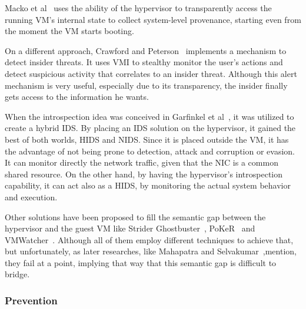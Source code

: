\par Macko et al~\cite{macko2011collecting} uses the ability of the hypervisor to transparently access the running \ac{VM}’s internal state to collect system-level provenance, starting even from the moment the \ac{VM} starts booting. 

\par On a different approach, Crawford and Peterson~\cite{crawford2013insider} implements a mechanism to detect insider threats. It uses \ac{VMI} to stealthy monitor the user’s actions and detect suspicious activity that correlates to an insider threat. Although this alert mechanism is very useful, especially due to its transparency, the insider finally gets access to the information he wants.

\par When the introspection idea was conceived in Garfinkel et al~\cite{garfinkel2003virtual}, it was utilized to create a hybrid \ac{IDS}. By placing an \ac{IDS} solution on the hypervisor, it gained the best of both worlds, \ac{HIDS} and \ac{NIDS}. Since it is placed outside the \ac{VM}, it has the advantage of not being prone to detection, attack and corruption or evasion. It can monitor directly the network traffic, given that the \ac{NIC} is a common shared resource. On the other hand, by having the hypervisor’s introspection capability, it can act also as a \ac{HIDS}, by monitoring the actual system behavior and execution. 

\par Other solutions have been proposed to fill the semantic gap between the hypervisor and the guest \ac{VM} like Strider Ghostbuster~\cite{wang2005detecting}, PoKeR~\cite{riley2009multi} and VMWatcher~\cite{jiang2007stealthy}. Although all of them employ different techniques to achieve that, but unfortunately, as later researches, like Mahapatra and Selvakumar~\cite{mahapatra2011online},mention, they fail at a point, implying that way that this semantic gap is difficult to bridge. 

\subsubsection{Prevention}


